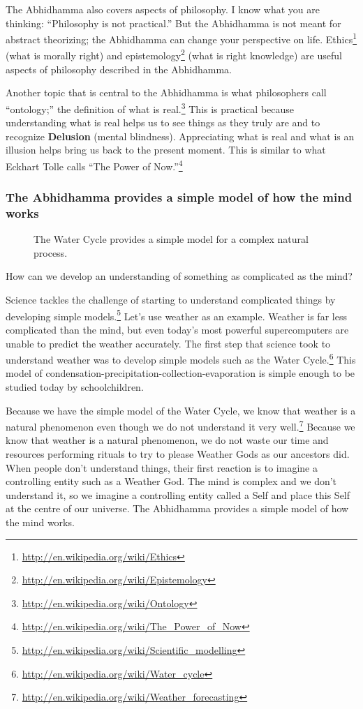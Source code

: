 \pagebreak

The Abhidhamma also covers aspects of philosophy. I know what you are thinking: “Philosophy is not practical.” But the Abhidhamma is not meant for abstract theorizing; the Abhidhamma can change your perspective on life. Ethics\footnote{\url{http://en.wikipedia.org/wiki/Ethics}} (what is morally right) and epistemology\footnote{\url{http://en.wikipedia.org/wiki/Epistemology}} (what is right knowledge) are useful aspects of philosophy described in the Abhidhamma. 

Another topic that is central to the Abhidhamma is what philosophers call “ontology;” the definition of what is real.\footnote{\url{http://en.wikipedia.org/wiki/Ontology}} This is practical because understanding what is real helps us to see things as they truly are and to recognize \textbf{Delusion} (mental blindness). Appreciating what is real and what is an illusion helps bring us back to the present moment. This is similar to what Eckhart Tolle calls “The Power of Now.”\footnote{\url{http://en.wikipedia.org/wiki/The_Power_of_Now}}

\subsubsection*{The Abhidhamma provides a simple model of how the mind works}

\begin{figure}[H]
\centering

\caption{The Water Cycle provides a simple model for a complex natural process.}
\label{fig:Rain}
\end{figure}

How can we develop an understanding of something as complicated as the mind? 

Science tackles the challenge of starting to understand complicated things by developing simple models.\footnote{\url{http://en.wikipedia.org/wiki/Scientific_modelling}} Let’s use weather as an example. Weather is far less complicated than the mind, but even today’s most powerful supercomputers are unable to predict the weather accurately. The first step that science took to understand weather was to develop simple models such as the Water Cycle.\footnote{\url{http://en.wikipedia.org/wiki/Water_cycle}} This model of condensation-precipitation-collection-evaporation is simple enough to be studied today by schoolchildren.

Because we have the simple model of the Water Cycle, we know that weather is a natural phenomenon even though we do not understand it very well.\footnote{\url{http://en.wikipedia.org/wiki/Weather_forecasting}} Because we know that weather is a natural phenomenon, we do not waste our time and resources performing rituals to try to please Weather Gods as our ancestors did. When people don’t understand things, their first reaction is to imagine a controlling entity such as a Weather God. The mind is complex and we don’t understand it, so we imagine a controlling entity called a Self and place this Self at the centre of our universe. The Abhidhamma provides a simple model of how the mind works.

